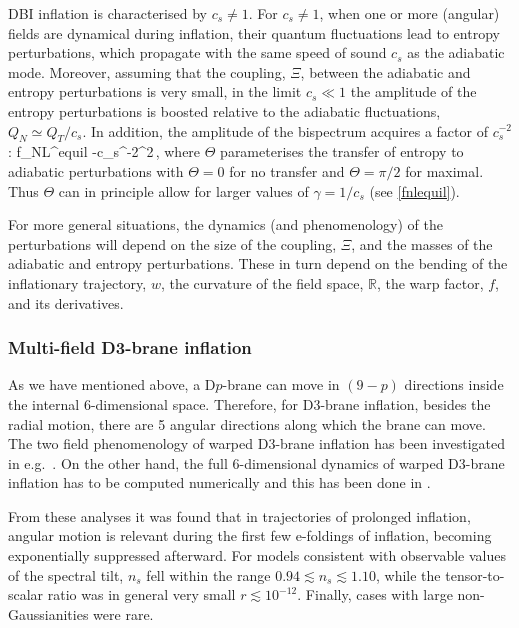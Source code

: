  DBI inflation is characterised by $c_s\ne1$.  For $c_s\ne1$,  when one or more (angular) fields are dynamical  during inflation, their quantum fluctuations lead to entropy perturbations, which propagate with the same speed of sound $c_s$ as the adiabatic mode. Moreover, assuming that the coupling, $\Xi$, between the adiabatic and entropy perturbations is very small, in the limit $c_s\ll 1$ the amplitude of the entropy perturbations is boosted relative to the adiabatic fluctuations, $Q_N\simeq Q_T/c_s$. 
In addition, the  amplitude of the bispectrum acquires a factor of $c_s^{-2}$:
\be
f_{\rm NL}^{\rm equil} \simeq -c_s^{-2}\cos^2\Theta\,,
\ee
where $\Theta$ parameterises the transfer of entropy to adiabatic perturbations with $\Theta=0$ for no transfer and $\Theta =\pi/2$ for maximal. Thus $\Theta$ can in principle allow for larger values of $\gamma=1/c_s$ (see \eqref{fnlequil}). 

For more general situations, the dynamics (and phenomenology) of the perturbations will depend on the size of the coupling, $\Xi$, and the masses of the adiabatic and entropy perturbations. These in turn depend on the bending of the inflationary trajectory, $w$, the curvature of the field space, ${\mathbb R}$,  the warp factor, $f$, and its derivatives. 

\subsubsection*{Multi-field D3-brane inflation}

As we have mentioned above, a D$p$-brane can move in $(9-p)$ directions inside the internal 6-dimensional space. Therefore, for D3-brane inflation, besides the radial motion, there are 5 angular directions along which the brane can move. The two field  phenomenology of  warped D3-brane inflation   has been investigated  in  e.g.~\cite{Panda:2007ie,Chen:2008ada,Chen:2010qz}. On the other hand, the full 6-dimensional dynamics of warped D3-brane inflation has to be computed numerically and this has been done in \cite{Agarwal:2011wm,Dias:2012nf,McAllister:2012am,Hertog:2015zwh,Marzouk:2021tsz}. 

From these analyses it was found that in  trajectories of prolonged inflation, angular motion is relevant during the first few e-foldings of inflation, becoming  exponentially suppressed afterward. For models consistent with observable values of the spectral tilt, $n_s$ fell within the range $0.94\lesssim n_s\lesssim 1.10$, while the tensor-to-scalar ratio was in general very small $r\lesssim 10^{-12}$. Finally, cases with large non-Gaussianities were rare.


